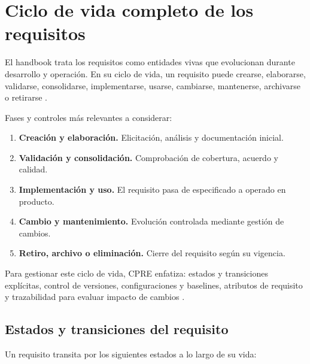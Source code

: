 \section{Ciclo de vida completo de los requisitos}
El handbook trata los requisitos como entidades vivas que evolucionan durante desarrollo y operaci\'on. En su ciclo de vida, un requisito puede crearse, elaborarse, validarse, consolidarse, implementarse, usarse, cambiarse, mantenerse, archivarse o retirarse \cite[pp.~130--132]{cpre}.

Fases y controles m\'as relevantes a considerar:
\begin{enumerate}[leftmargin=1.2em]
  \item \textbf{Creaci\'on y elaboraci\'on.} Elicitaci\'on, an\'alisis y documentaci\'on inicial.
  \item \textbf{Validaci\'on y consolidaci\'on.} Comprobaci\'on de cobertura, acuerdo y calidad.
  \item \textbf{Implementaci\'on y uso.} El requisito pasa de especificado a operado en producto.
  \item \textbf{Cambio y mantenimiento.} Evoluci\'on controlada mediante gesti\'on de cambios.
  \item \textbf{Retiro, archivo o eliminaci\'on.} Cierre del requisito seg\'un su vigencia.
\end{enumerate}

Para gestionar este ciclo de vida, CPRE enfatiza: estados y transiciones expl\'icitas, control de versiones, configuraciones y baselines, atributos de requisito y trazabilidad para evaluar impacto de cambios \cite[pp.~131--140]{cpre}.

\subsection{Estados y transiciones del requisito}

Un requisito transita por los siguientes estados a lo largo de su vida:


